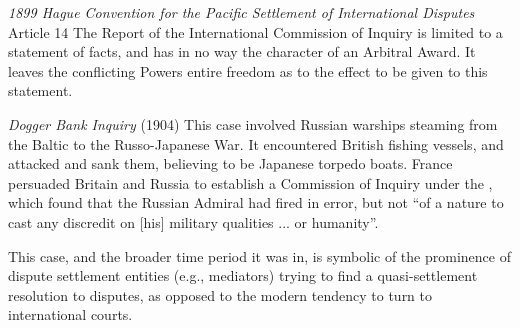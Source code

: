 \begin{conventiondetails}{\textit{1899 Hague Convention for the Pacific Settlement of International Disputes} Article 14}
    \flushleft
    The Report of the International Commission of Inquiry is limited to a statement of facts, and has in no way the character of an Arbitral Award. It leaves the conflicting Powers entire freedom as to the effect to be given to this statement.
\end{conventiondetails}

\begin{casedetails}{\textit{Dogger Bank Inquiry} (1904)}
    \flushleft
    This case involved Russian warships steaming from the Baltic to the Russo-Japanese War. It encountered British fishing vessels, and attacked and sank them, believing to be Japanese torpedo boats. France persuaded Britain and Russia to establish a Commission of Inquiry under the , which found that the Russian Admiral had fired in error, but not ``of a nature to cast any discredit on [his] military qualities ... or humanity''.

    \vspace{\baselineskip}

    This case, and the broader time period it was in, is symbolic of the prominence of dispute settlement entities (e.g., mediators) trying to find a quasi-settlement resolution to disputes, as opposed to the modern tendency to turn to international courts.
\end{casedetails}

